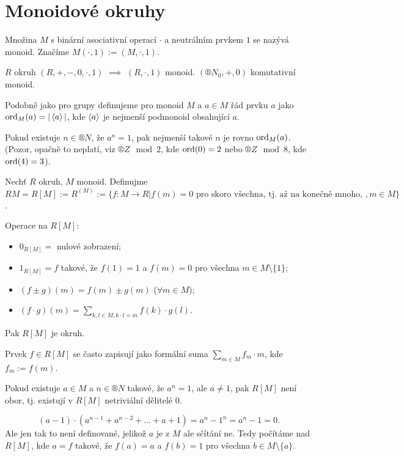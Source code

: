 \documentclass[12pt]{article}					%
\begin{document}
\section{Monoidové okruhy}
\begin{definice}[Monoid]
	Množina $M$ s binární asociativní operací $·$ a neutrálním prvkem $1$ se nazývá monoid. Značíme $M(·, 1) := (M, ·, 1)$.
\end{definice}

\begin{priklady}
	$R$ okruh $(R, +, -, 0, ·, 1)$ $\implies$ $(R, ·, 1)$ monoid. $(®N_0, +, 0)$ komutativní monoid.
\end{priklady}

\begin{poznamka}[Řád]
	Podobně jako pro grupy definujeme pro monoid $M$ a $a \in M$ řád prvku $a$ jako $\operatorname{ord}_M(a) = |\left\langle a\right\rangle|$, kde $\left\langle a\right\rangle$ je nejmenší podmonoid obsahující $a$.

	Pokud existuje $n \in ®N$, že $a^n = 1$, pak nejmenší takové $n$ je rovno $\operatorname{ord}_M(a)$. (Pozor, opačně to neplatí, viz $®Z \mod 2$, kde $\operatorname{ord}(0) = 2$ nebo $®Z \mod 8$, kde $\operatorname{ord}(4) = 3$).
\end{poznamka}

\begin{definice}[RM]
	Nechť $R$ okruh, $M$ monoid. Definujme $RM = R[M] := R^{(M)} := \{f: M \rightarrow R | f(m) = 0 \text{ pro skoro všechna, tj. až na konečně mnoho, }, m \in M\}$.

	Operace na $R[M]$:

	\begin{itemize}
		\item $0_{R[M]} =$ nulové zobrazení;
		\item $1_{R[M]} = f$ takové, že $f(1) = 1$ a $f(m) = 0$ pro všechna $m \in M \setminus \{1\}$;
		\item $(f ± g)(m) = f(m) ± g(m)$ ($\forall m \in M$);
		\item $(f·g)(m) = \sum_{k, l \in M, k·l=m} f(k)·g(l)$.
	\end{itemize}

	Pak $R[M]$ je okruh.

	\begin{poznamkain}
		Prvek $f \in R[M]$ se často zapisují jako formální suma $\sum_{m \in M} f_m·m$, kde $f_m := f(m)$.
	\end{poznamkain}
\end{definice}

\begin{tvrzeni}
	Pokud existuje $a \in M$ a $n \in ®N$ takové, že $a^n = 1$, ale $a ≠ 1$, pak $R[M]$ není obor, tj. existují v $R[M]$ netriviální dělitelé 0.

	\begin{dukazin}
		$$ (a - 1)·(a^{n-1} + a^{n - 2} + … + a + 1) = a^n - 1^n = a^n - 1 = 0. $$
		Ale jen tak to není definované, jelikož $a$ je z $M$ ale sčítání ne. Tedy počítáme nad $R[M]$, kde $a = f$ takové, že $f(a) = a$ a $f(b) = 1$ pro všechna $b \in M \setminus \{a\}$.
	\end{dukazin}
\end{tvrzeni}
\end{document}
